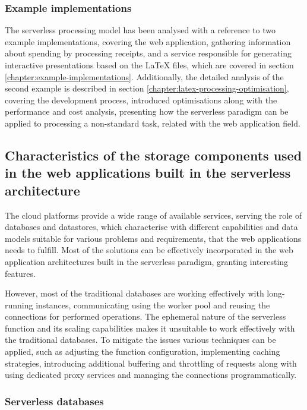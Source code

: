 \subsubsection{Example implementations}

The serverless processing model has been analysed with a reference to two example implementations, covering the web application, gathering information about spending by processing receipts, and a service responsible for generating interactive presentations based on the LaTeX files, which are covered in section \ref{chapter:example-implementations}.
Additionally, the detailed analysis of the second example is described in section \ref{chapter:latex-processing-optimisation}, covering the development process, introduced optimisations along with the performance and cost analysis, presenting how the serverless paradigm can be applied to processing a non-standard task, related with the web application field.

\subsection{Characteristics of the storage components used in the web applications built in the serverless architecture}

The cloud platforms provide a wide range of available services, serving the role of databases and datastores, which characterise with different capabilities and data models suitable for various problems and requirements, that the web applications needs to fulfill.
Most of the solutions can be effectively incorporated in the web application architectures built in the serverless paradigm, granting interesting features.

However, most of the traditional databases are working effectively with long-running instances, communicating using the worker pool and reusing the connections for performed operations.
The ephemeral nature of the serverless function and its scaling capabilities makes it unsuitable to work effectively with the traditional databases.
To mitigate the issues various techniques can be applied, such as adjusting the function configuration, implementing caching strategies, introducing additional buffering and throttling of requests along with using dedicated proxy services and managing the connections programmatically.

\subsubsection{Serverless databases}

